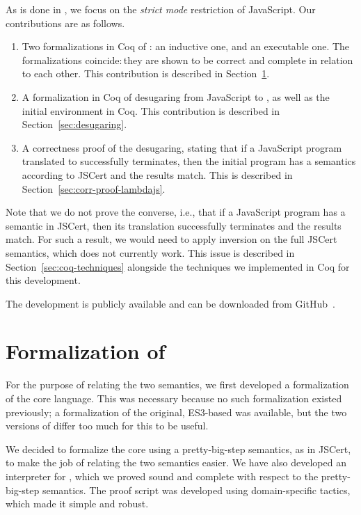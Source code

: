 \documentclass{llncs}
\newcommand{\asi}[1]{\todo[color=green,inline]{#1}}
\begin{document}
As is done in \lambdajs, we focus on the \emph{strict mode} restriction of
JavaScript. Our contributions are as follows.
\begin{enumerate}
\item Two formalizations in Coq of \lambdajs: an inductive one, and an
  executable one. The formalizations coincide: they are shown to be correct and
  complete in relation to each other. This contribution is described in
  Section~\ref{sec:form-lambdajs}.
\item A formalization in Coq of desugaring from JavaScript to \lambdajs, as well
  as the initial \lambdajs environment in Coq. This contribution is described in
  Section~\ref{sec:desugaring}.
\item A correctness proof of the desugaring, stating that if a JavaScript
  program translated to \lambdajs successfully terminates, then the initial
  program has a semantics according to JSCert and the results match. This is
  described in Section~\ref{sec:corr-proof-lambdajs}.
\end{enumerate}

Note that we do not prove the converse, i.e., that if a JavaScript program has a
semantic in JSCert, then its \lambdajs translation successfully terminates and
the results match. For such a result, we would need to apply \textsf{inversion}
on the full JSCert semantics, which does not currently work. This issue is
described in Section~\ref{sec:coq-techniques} alongside the techniques we
implemented in Coq for this development.

The development is publicly available and can be downloaded from
GitHub~\cite{github:lambdacert}.

\section{Formalization of \lambdajs}
\label{sec:form-lambdajs}

\asi{describe the changes to the language.}

For the purpose of relating the two semantics, we first developed a
formalization of the \lambdajs core language. This was necessary because no such
formalization existed previously; a formalization of the original, ES3-based
\lambdajs was available\cite{github:brownplt/LambdaJS}, but the two
versions of \lambdajs differ too much for this to be useful.

We decided to formalize the \lambdajs core using a
pretty-big-step semantics, as in JSCert, to make the job of
relating the two semantics easier. We have also developed
an interpreter for \lambdajs, which we proved sound and
complete with respect to the pretty-big-step semantics.
The proof script was developed using domain-specific tactics,
which made it simple and robust.
\end{document}
